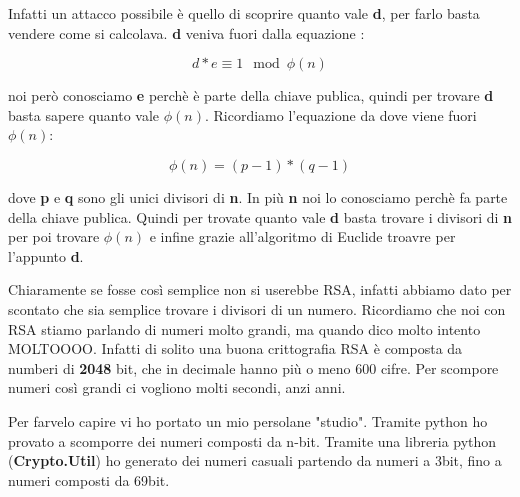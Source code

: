 \documentclass{rapport}
\begin{document}
Infatti un attacco possibile è quello di scoprire quanto vale \textbf{d}, per farlo basta vendere come si calcolava. \textbf{d} veniva fuori dalla equazione :

\begin{equation*}
    d * e \equiv 1 \mod \phi(n)
\end{equation*}


 noi però conosciamo \textbf{e} perchè è parte della chiave publica, quindi per trovare \textbf{d} basta sapere quanto vale \textbf{$\phi(n)$}. Ricordiamo l'equazione da dove viene fuori \textbf{$\phi(n)$}:

 \begin{equation*}
     \phi(n) = (p-1) * (q-1)
 \end{equation*}

 dove \textbf{p} e \textbf{q} sono gli unici divisori di \textbf{n}. In più \textbf{n} noi lo conosciamo perchè fa parte della chiave publica. Quindi per trovate quanto vale \textbf{d} basta trovare i divisori di \textbf{n} per poi trovare \textbf{$\phi(n)$} e infine grazie all'algoritmo di Euclide troavre per l'appunto \textbf{d}.

 Chiaramente se fosse così semplice non si userebbe RSA, infatti abbiamo dato per scontato che sia semplice trovare i divisori di un numero. Ricordiamo che noi con RSA stiamo parlando di numeri molto grandi, ma quando dico molto intento MOLTOOOO. Infatti di solito una buona crittografia RSA è composta da numberi di \textbf{2048} bit, che in decimale hanno più o meno 600 cifre. Per scompore numeri così grandi ci vogliono molti secondi, anzi anni.


 Per farvelo capire vi ho portato un mio persolane "studio". Tramite python ho provato a scomporre dei numeri composti da n-bit. Tramite una libreria python (\textbf{Crypto.Util}) ho generato dei numeri casuali partendo da numeri a 3bit, fino a numeri composti da 69bit. 
\begin{center}
\end{center}
\end{document}
